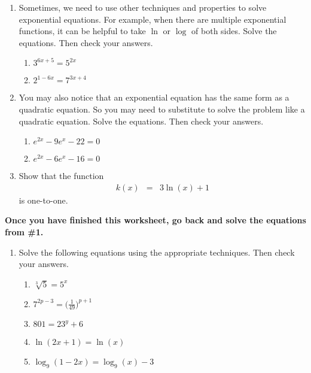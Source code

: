 \begin{enumerate}
\clearpage

\item Sometimes, we need to use other techniques and properties to
  solve exponential equations.  For example, when there are multiple
  exponential functions, it can be helpful to take $\ln$ or $\log$ of
  both sides.  Solve the equations.  Then check your answers.
\begin{enumerate}
\item $3^{6x+5}=5^{2x}$
\vfill

\item $2^{1-6x}=7^{3x+4}$
\vfill

\end{enumerate}
\clearpage

\item You may also notice that an exponential equation has the same
  form as a quadratic equation.  So you may need to substitute to
  solve the problem like a quadratic equation.  Solve the equations.
  Then check your answers.
\begin{enumerate}
\item $e^{2x}-9e^x-22=0$\vfill
\item $e^{2x}-6e^x-16=0$\vfill
\end{enumerate}

\item Show that the function
  \begin{eqnarray*}
    k(x) & = & 3 \ln(x) + 1
  \end{eqnarray*}
  is one-to-one.
  \vfill

\end{enumerate}

\noindent \textbf{Once you have finished this worksheet, go back and
  solve the equations from \#1.}



\begin{enumerate}
\item Solve the following equations using the appropriate techniques.
  Then check your answers.
  \begin{enumerate}
  \item $\sqrt[3]{5}=5^x$
  \item $\displaystyle 7^{2p-3}=\Big(\frac{1}{49}\Big)^{p+1}$
  \item $801=23^y+6$
  \item $\ln(2x+1) = \ln(x)$
  \item $\log_9(1-2x) = \log_9(x) - 3$
  \end{enumerate}

\end{enumerate}
